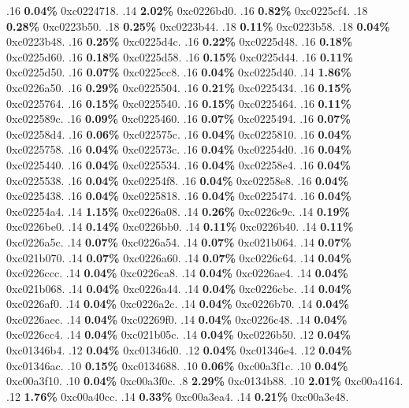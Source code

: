 \begin{profile}
{.16 \textbf{0.04\%} 0xc0224718. 
.14 \textbf{2.02\%} 0xc0226bd0. 
.16 \textbf{0.82\%} 0xc0225cf4. 
.18 \textbf{0.28\%} 0xc0223b50. 
.18 \textbf{0.25\%} 0xc0223b44. 
.18 \textbf{0.11\%} 0xc0223b58. 
.18 \textbf{0.04\%} 0xc0223b48. 
.16 \textbf{0.25\%} 0xc0225d4c. 
.16 \textbf{0.22\%} 0xc0225d48. 
.16 \textbf{0.18\%} 0xc0225d60. 
.16 \textbf{0.18\%} 0xc0225d58. 
.16 \textbf{0.15\%} 0xc0225d44. 
.16 \textbf{0.11\%} 0xc0225d50. 
.16 \textbf{0.07\%} 0xc0225cc8. 
.16 \textbf{0.04\%} 0xc0225d40. 
.14 \textbf{1.86\%} 0xc0226a50. 
.16 \textbf{0.29\%} 0xc0225504. 
.16 \textbf{0.21\%} 0xc0225434. 
.16 \textbf{0.15\%} 0xc0225764. 
.16 \textbf{0.15\%} 0xc0225540. 
.16 \textbf{0.15\%} 0xc0225464. 
.16 \textbf{0.11\%} 0xc022589c. 
.16 \textbf{0.09\%} 0xc0225460. 
.16 \textbf{0.07\%} 0xc0225494. 
.16 \textbf{0.07\%} 0xc02258d4. 
.16 \textbf{0.06\%} 0xc022575c. 
.16 \textbf{0.04\%} 0xc0225810. 
.16 \textbf{0.04\%} 0xc0225758. 
.16 \textbf{0.04\%} 0xc022573c. 
.16 \textbf{0.04\%} 0xc02254d0. 
.16 \textbf{0.04\%} 0xc0225440. 
.16 \textbf{0.04\%} 0xc0225534. 
.16 \textbf{0.04\%} 0xc02258e4. 
.16 \textbf{0.04\%} 0xc0225538. 
.16 \textbf{0.04\%} 0xc02254f8. 
.16 \textbf{0.04\%} 0xc02258e8. 
.16 \textbf{0.04\%} 0xc0225438. 
.16 \textbf{0.04\%} 0xc0225818. 
.16 \textbf{0.04\%} 0xc0225474. 
.16 \textbf{0.04\%} 0xc02254a4. 
.14 \textbf{1.15\%} 0xc0226a08. 
.14 \textbf{0.26\%} 0xc0226c9c. 
.14 \textbf{0.19\%} 0xc0226be0. 
.14 \textbf{0.14\%} 0xc0226bb0. 
.14 \textbf{0.11\%} 0xc0226b40. 
.14 \textbf{0.11\%} 0xc0226a5c. 
.14 \textbf{0.07\%} 0xc0226a54. 
.14 \textbf{0.07\%} 0xc021b064. 
.14 \textbf{0.07\%} 0xc021b070. 
.14 \textbf{0.07\%} 0xc0226a60. 
.14 \textbf{0.07\%} 0xc0226c64. 
.14 \textbf{0.04\%} 0xc0226ccc. 
.14 \textbf{0.04\%} 0xc0226ca8. 
.14 \textbf{0.04\%} 0xc0226ae4. 
.14 \textbf{0.04\%} 0xc021b068. 
.14 \textbf{0.04\%} 0xc0226a44. 
.14 \textbf{0.04\%} 0xc0226cbc. 
.14 \textbf{0.04\%} 0xc0226af0. 
.14 \textbf{0.04\%} 0xc0226a2c. 
.14 \textbf{0.04\%} 0xc0226b70. 
.14 \textbf{0.04\%} 0xc0226aec. 
.14 \textbf{0.04\%} 0xc02269f0. 
.14 \textbf{0.04\%} 0xc0226c48. 
.14 \textbf{0.04\%} 0xc0226cc4. 
.14 \textbf{0.04\%} 0xc021b05c. 
.14 \textbf{0.04\%} 0xc0226b50. 
.12 \textbf{0.04\%} 0xc01346b4. 
.12 \textbf{0.04\%} 0xc01346d0. 
.12 \textbf{0.04\%} 0xc01346e4. 
.12 \textbf{0.04\%} 0xc01346ac. 
.10 \textbf{0.15\%} 0xc0134688. 
.10 \textbf{0.06\%} 0xc00a3f1c. 
.10 \textbf{0.04\%} 0xc00a3f10. 
.10 \textbf{0.04\%} 0xc00a3f0c. 
.8 \textbf{2.29\%} 0xc0134b88. 
.10 \textbf{2.01\%} 0xc00a4164. 
.12 \textbf{1.76\%} 0xc00a40cc. 
.14 \textbf{0.33\%} 0xc00a3ea4. 
.14 \textbf{0.21\%} 0xc00a3e48. 
}
\end{profile}
